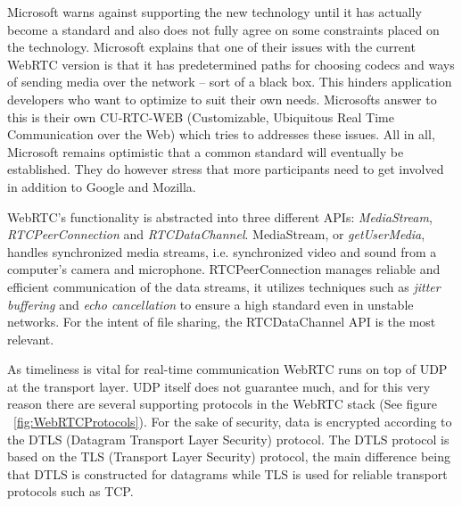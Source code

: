 Microsoft warns against supporting the new technology until it has actually become a standard and also does not fully agree on some constraints placed on the technology\cite{WebRTCAndMicrosoft:2012:Online}. Microsoft explains that one of their issues with the current WebRTC version is that it has predetermined paths for choosing codecs and ways of sending media over the network – sort of a black box. This hinders application developers who want to optimize to suit their own needs. Microsofts answer to this is their own CU-RTC-WEB (Customizable, Ubiquitous Real Time Communication over the Web) which tries to addresses these issues.
All in all, Microsoft remains optimistic that a common standard will eventually be established\cite{WebRTCAndMicrosoft:2012:Online}. They do however stress that more participants need to get involved in addition to Google and Mozilla.

WebRTC's functionality is abstracted into three different APIs: \emph{MediaStream}, \emph{RTCPeerConnection} and \emph{RTCDataChannel}\cite{WebRTCBasics:2012:Online}. MediaStream, or \emph{getUserMedia}, handles synchronized media streams, i.e. synchronized video and sound from a computer's camera and microphone. RTCPeerConnection manages reliable and efficient communication of the data streams, it utilizes techniques such as \emph{jitter buffering} and \emph{echo cancellation} to ensure a high standard even in unstable networks. For the intent of file sharing, the RTCDataChannel API is the most relevant.

As timeliness is vital for real-time communication WebRTC runs on top of UDP at the transport layer. UDP itself does not guarantee much, and for this very reason there are several supporting protocols in the WebRTC stack (See figure ~\ref{fig:WebRTCProtocols}). For the sake of security, data is encrypted according to the DTLS (Datagram Transport Layer Security) protocol. The DTLS protocol is based on the TLS (Transport Layer Security) protocol, the main difference being that DTLS is constructed for datagrams while TLS is used for reliable transport protocols such as TCP.


